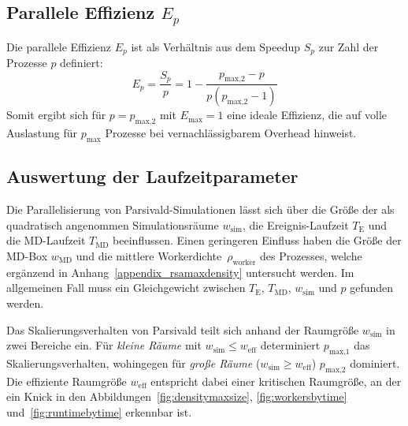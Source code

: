 \subsection{Parallele Effizienz \texorpdfstring{$E_p$}{Ep}}

Die parallele Effizienz $E_p$ ist als Verhältnis aus dem Speedup $S_p$ zur Zahl der Prozesse $p$ definiert:
\begin{equation}
  E_p = \frac{S_p}{p} = 1 - \frac{p_\text{max,2} - p}{p (p_\text{max,2} - 1)}
\end{equation}
Somit ergibt sich für $p = p_\text{max,2}$ mit $E_\text{max} = 1$ eine ideale Effizienz, die auf volle Auslastung für $p_\text{max}$ Prozesse bei vernachlässigbarem Overhead hinweist.



\subsection{Auswertung der Laufzeitparameter}
\label{runtimeanalysis}

Die Parallelisierung von Parsivald-Simulationen lässt sich über die Größe der als quadratisch angenommen Simulationsräume $w_\text{sim}$, die Ereignis-Laufzeit $T_\text{E}$ und die MD-Laufzeit $T_\text{MD}$ beeinflussen.
Einen geringeren Einfluss haben die Größe der MD-Box $w_\text{MD}$ und die mittlere Workerdichte~$\rho_\text{worker}$ des Prozesses, welche ergänzend in Anhang~\ref{appendix_rsamaxdensity} untersucht werden.
Im allgemeinen Fall muss ein Gleichgewicht zwischen $T_\text{E}$, $T_\text{MD}$, $w_\text{sim}$ und $p$ gefunden werden.

Das Skalierungsverhalten von Parsivald teilt sich anhand der Raumgröße $w_\text{sim}$ in zwei Bereiche ein.
Für \textit{kleine Räume} mit $w_\text{sim} \le w_\text{eff}$ determiniert $p_\text{max,1}$ das Skalierungsverhalten, wohingegen für \textit{große Räume} ($w_\text{sim} \ge w_\text{eff}$) $p_\text{max,2}$ dominiert.
Die effiziente Raumgröße $w_\text{eff}$ entspricht dabei einer kritischen Raumgröße, an der ein Knick in den Abbildungen~\ref{fig:densitymaxsize}, \ref{fig:workersbytime} und~\ref{fig:runtimebytime} erkennbar ist.

